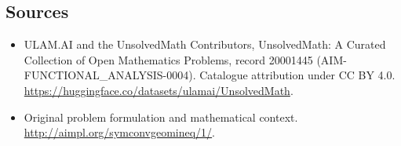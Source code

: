 \documentclass[11pt]{article}
\begin{document}
\subsection{Sources}
\begin{itemize}
\item[\hypertarget{source:20001445:1}{S1}] ULAM.AI and the UnsolvedMath Contributors, UnsolvedMath: A Curated Collection of Open Mathematics Problems, record 20001445 (AIM-FUNCTIONAL\_ANALYSIS-0004). Catalogue attribution under CC BY 4.0.
\url{https://huggingface.co/datasets/ulamai/UnsolvedMath}.
\item[\hypertarget{source:20001445:2}{S2}] Original problem formulation and mathematical context.
\url{http://aimpl.org/symconvgeomineq/1/}.
\end{itemize}
\label{end:20001445}
\end{document}
